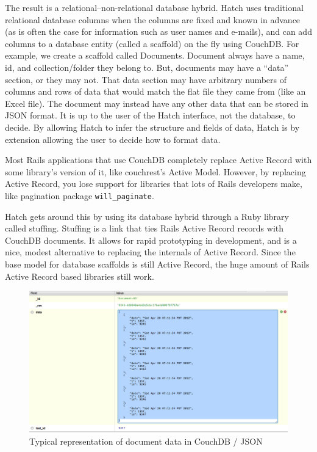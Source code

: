 The result is a relational--non-relational database hybrid. Hatch uses traditional 
relational database columns when the columns are fixed and known in advance (as is
often the case for information such as user names and e-mails), and can add columns to
a database entity (called a scaffold) on the fly using CouchDB. For example, we create
a scaffold called Documents. Document always have a name, id, and collection/folder
they belong to. But, documents may have a ``data'' section, or they may not. That
data section may have arbitrary numbers of columns and rows of data that would match the flat 
file they came from (like an Excel file). The document may instead have any other data that
can be stored in JSON format. It is up to the user of the Hatch interface, not the database, to 
decide. By allowing Hatch to infer the structure and fields of data, Hatch
is by extension allowing the user to decide how to format data.

Most Rails applications that use CouchDB completely replace Active Record with some
library's version of it, like couchrest's Active Model. However, by replacing
Active Record, you lose support for libraries that lots of Rails developers
make, like pagination package \texttt{will\_paginate}. 

Hatch gets around this by using its database hybrid through a Ruby library called
stuffing. Stuffing is a link that ties Rails Active Record records with
CouchDB documents. It allows for rapid prototyping in development, and is a nice, modest
alternative to replacing the internals of Active Record. Since the base model for 
database scaffolds is still Active Record, the huge amount of Rails Active Record based
libraries still work.

\pagebreak

\begin{figure}[h]
	\begin{center}
	\includegraphics[width=120mm]{images/couchdb_json_ex}
	\caption{Typical representation of document data in CouchDB / JSON} 
	\label{couchdb_json_ex}
	\end{center}
\end{figure}
